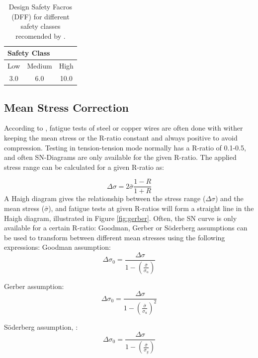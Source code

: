 \begin{table} [H]
\centering
\begin{tabular}{ |c|c|c|}
\hline
\multicolumn{3}{|l|}{\hspace{0.8cm}Safety Class}\\
 \hline
 \hline
Low & Medium & High \\
3.0 & 6.0 & 10.0\\
 \hline
\end{tabular}
\caption{Design Safety Facros (DFF) for different safety classes  recomended by \cite{riserfat}.}
\label{table:dff}
\end{table}
\subsection{Mean Stress Correction}
\label{sec:meanstress}
According to \cite{Savik2016}, fatigue tests of steel or copper wires are often done with wither keeping the mean stress or the R-ratio constant and always positive to avoid compression. Testing in tension-tension mode normally has a R-ratio of 0.1-0.5, and often SN-Diagrams are only available for the given R-ratio.  The applied stress range can be calculated for a given R-ratio as:

\begin{equation}
    \Delta \sigma = 2 \bar{\sigma} \frac{1-R}{1+R}
\end{equation}
A Haigh diagram gives the relationship between the stress range ($\Delta \sigma$) and the mean stress ($\bar{\sigma}$),  and fatigue tests at given R-ratios will form a straight line in the Haigh diagram, illustrated in Figure \ref{fig:gerber}. Often, the SN curve is only available for a certain R-ratio: Goodman, Gerber or Söderberg assumptions can be used to transform between different mean stresses using the following expressions:\newline
\newline
\noindent Goodman assumption:
\begin{equation}
    \Delta \sigma_0 = \frac{\Delta \sigma}{1-(\frac{\bar{\sigma}}{\sigma_u})}
\end{equation}

\noindent Gerber assumption:
\begin{equation}
    \Delta \sigma_0 = \frac{\Delta \sigma}{1-(\frac{\bar{\sigma}}{\sigma_u})^2}
\end{equation}

\noindent Söderberg assumption, \cite{fatiguehand}:
\begin{equation}
    \Delta \sigma_0 = \frac{\Delta \sigma}{1-(\frac{\bar{\sigma}}{\sigma_y})}
\end{equation}

